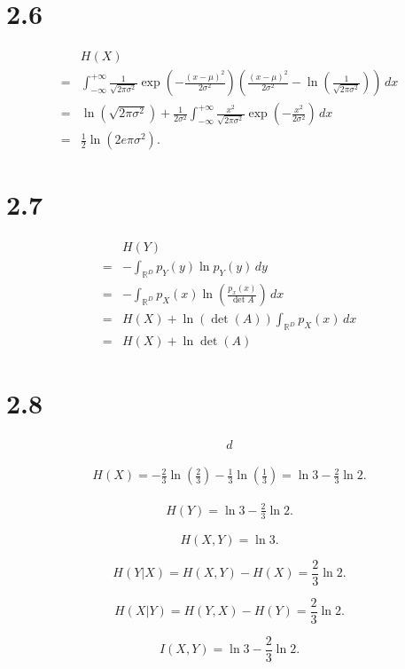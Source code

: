 \documentclass{article}
\begin{document}
\section{2.6}

\[
\begin{aligned}
    &H(X)\\
    =&\int^{+\infty}_{-\infty}\frac{1}{\sqrt{2\pi\sigma^2}}\exp\left(-\frac{(x-\mu)^2}{2\sigma^2}\right) \left(\frac{(x-\mu)^2}{2\sigma^2}-\ln(\frac{1}{\sqrt{2\pi\sigma^2}})\right)\,dx\\
    =&\ln(\sqrt{2\pi\sigma^2})+\frac{1}{2\sigma^2}\int^{+\infty}_{-\infty}\frac{x^2}{\sqrt{2\pi\sigma^2}}\exp\left(-\frac{x^2}{2\sigma^2}\right)\,dx\\
    =&\frac{1}{2}\ln(2e\pi\sigma^2).
\end{aligned}
\]

\section{2.7}

\[
\begin{aligned}
    &H(Y)\\
    =&-\int_{\mathbb{R}^D} p_Y(y)\ln p_Y(y)\, dy\\
    =&-\int_{\mathbb{R}^D} p_X(x) \ln(\frac{p_x(x)}{\det A})\,dx\\
    =&H(X)+\ln(\det(A))\int_{\mathbb{R}^D}p_X(x)\,dx\\
    =&H(X)+\ln \det (A)
\end{aligned}
\]

\section{2.8}

\[
\begin{aligned}
    d
\end{aligned}
\]

\[
\begin{aligned}
    H(X)=-\frac{2}{3}\ln(\frac{2}{3})-\frac{1}{3}\ln(\frac{1}{3})=\ln3-\frac{2}{3}\ln2.
\end{aligned}
\]

\[
\begin{aligned}
    H(Y)=\ln3-\frac{2}{3}\ln2.
\end{aligned}
\]

\[
    H(X,Y)=\ln 3.
\]

\[
 H(Y|X)=H(X,Y)-H(X)=\frac{2}{3}\ln2.
\]

\[
H(X|Y)=H(Y,X)-H(Y)=\frac{2}{3}\ln2.
\]

\[
I(X,Y)=\ln3-\frac{2}{3}\ln2.
\]
\end{document}
